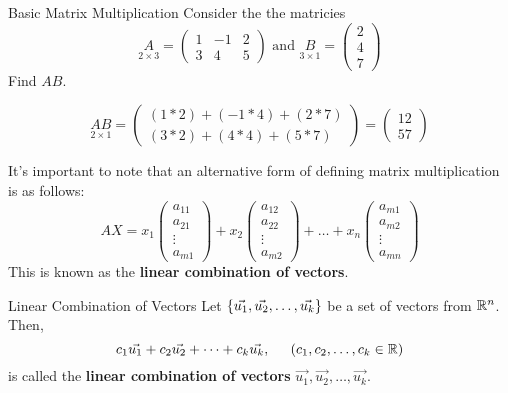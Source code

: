 \begin{example}{Basic Matrix Multiplication}{}
    Consider the the matricies 
    \[ 
        \underset{2 \times 3}{A} = 
        \begin{pmatrix}
            1 & -1 & 2 \\
            3 & 4 & 5 
        \end{pmatrix} 
        \text{ and }
        \underset{3 \times 1}{B} = 
        \begin{pmatrix}
            2 \\
            4 \\
            7
        \end{pmatrix}
    \]
    Find $AB$.
    \begin{solution}
        \[ 
            \underset{2 \times 1}{AB} = 
            \begin{pmatrix}
                (1 * 2) + (-1 * 4) + (2 * 7) \\
                (3 * 2) + (4 * 4) + (5 * 7) 
            \end{pmatrix}
            = 
            \begin{pmatrix}
                12 \\
                57
            \end{pmatrix}
        \]
    \end{solution}
\end{example}

It's important to note that an alternative form of defining matrix multiplication is as follows:
\[
    AX = 
    x_1\begin{pmatrix}
        a_{11} \\ a_{21} \\ \vdots \\ a_{m1}
    \end{pmatrix}
    + x_2\begin{pmatrix}
        a_{12} \\ a_{22} \\ \vdots \\ a_{m2}
    \end{pmatrix}
    + \dots + 
    x_n\begin{pmatrix}
        a_{m1} \\ a_{m2} \\ \vdots \\ a_{mn}
    \end{pmatrix}
\]
This is known as the \textbf{linear combination of vectors}.

\begin{defbox}{Linear Combination of Vectors}{}
    Let $\left\{\vec{u_1}, \vec{u_2}, \dots, \vec{u_k} \right\}$ be a set of vectors from $\mathbb R^{n}$. Then, 
    \[
        c_1\vec{u_1} + c_2\vec{u_2} + \dots + c_k\vec{u_k}, \hspace{0.2in} (c_1, c_2, \dots, c_k \in \mathbb R) 
    \]
    is called the \textbf{linear combination of vectors} $\vec{u_1}, \vec{u_2}, \dots, \vec{u_k}$.
\end{defbox}

